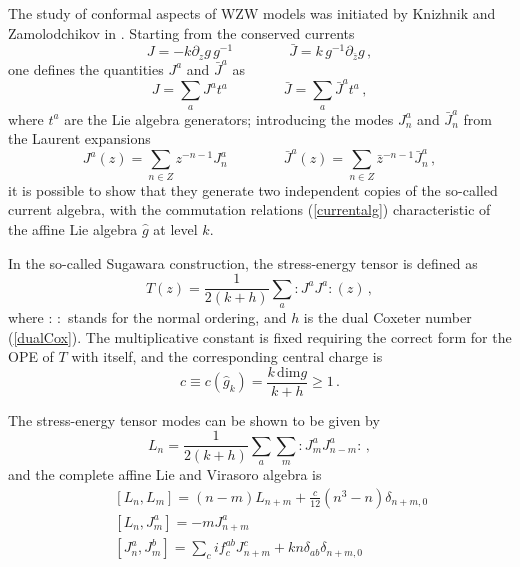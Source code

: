 \documentclass[a4paper,12pt]{report}
\begin{document}
The study of conformal aspects of WZW models was initiated by Knizhnik and Zamolodchikov in \cite{knizam}.
Starting from the conserved currents
\begin{equation}
J=-k\partial_{z}g\,g^{-1}\qquad\qquad \bar{J}=k\,g^{-1}\partial_{\bar{z}}g \,,
\end{equation}
one defines the quantities $J^{a}$ and $\bar{J}^{a}$ as
\begin{equation}
J=\sum_{a}J^{a}t^{a}\qquad\qquad \bar{J}=\sum_{a}\bar{J}^{a}t^{a}\,,
\end{equation}
where $t^{a}$ are the Lie algebra generators; introducing the modes $J_{n}^{a}$ and $\bar{J}_{n}^{a}$ from the
Laurent expansions
\begin{equation}
J^{a}(z)=\sum_{n\in Z}z^{-n-1}J_{n}^{a}\qquad\qquad \bar{J}^{a}(z)=\sum_{n\in Z}\bar{z}^{-n-1}\bar{J}_{n}^{a}\,,
\end{equation}
it is possible to show that they generate two independent copies of the so-called current algebra, with the
commutation relations (\ref{currentalg}) characteristic of the affine Lie algebra $\hat{g}$ at level $k$.

In the so-called Sugawara construction, the stress-energy tensor is defined as
\begin{equation}
T(z)=\frac{1}{2(k+h)}\sum_{a}:J^{a}J^{a}:(z)\,,
\end{equation}
where $:\,:$ stands for the normal ordering, and $h$ is the dual Coxeter number (\ref{dualCox}). The
multiplicative constant is fixed requiring the correct form for the OPE of $T$ with itself, and the corresponding
central charge is
\begin{equation}\label{cWZW}
c\equiv c\left(\hat{g}_{k}\right)=\frac{k\,\textrm{dim}g}{k+h}\geq 1\,.
\end{equation}

The stress-energy tensor modes can be shown to be given by
\begin{equation}\label{WZWVirmodes}
L_{n}=\frac{1}{2(k+h)}\sum_{a}\sum_{m}:J_{m}^{a}J_{n-m}^{a}:\,,
\end{equation}
and the complete affine Lie and Virasoro algebra is
\begin{eqnarray}
&& [L_{n},L_{m}]= (n-m)L_{n+m}+\frac{c}{12}(n^{3}-n)\delta_{n+m,0} \\
&& [L_{n},J_{m}^{a}]= -m J_{n+m}^{a} \\
&& [J_{n}^{a},J_{m}^{b}]= \sum_{c}if^{ab}_{c}J_{n+m}^{c}+k n\delta_{ab}\delta_{n+m,0}
\end{eqnarray}
\end{document}
